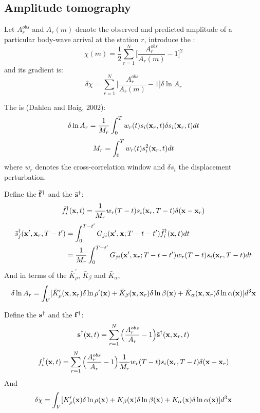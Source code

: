 \subsection{Amplitude tomography}
Let $A_r^{obs}$ and $A_r(m)$ denote the observed and predicted amplitude of a particular body-wave arrival at the station $r$, introduce the :
\[ \chi(m)=\frac{1}{2}\sum_{r=1}^N\Big[\frac{A_r^{obs}}{A_r(m)}-1\Big]^2 \]
and its gradient is:
\[ \delta\chi=\sum_{r=1}^N\Big[\frac{A_r^{obs}}{A_r(m)}-1\Big]\delta\ln A_r \]\par
The  is (Dahlen and Baig, 2002):
\[ \delta\ln A_r=\frac{1}{M_r}\int_0^Tw_r(t)s_i(\mathbf{x}_r,t)\delta s_i(\mathbf{x}_r,t)dt \]
\[ M_r=\int_0^Tw_r(t)s_i^2(\mathbf{x}_r,t)dt \]
where $w_r$ denotes the cross-correlation window and $\delta s_i$ the displacement perturbation.\par
Define the  $\bar{\mathbf{f}}^\dagger$ and the  $\bar{\mathbf{s}}^\dagger$:
\[ \bar f_i^\dagger(\mathbf{x},t)=\frac{1}{M_r}w_r(T-t)s_i(\mathbf{x}_r,T-t)\delta(\mathbf{x}-\mathbf{x}_r) \]
\begin{align*}
  \bar s_j^\dagger(\mathbf{x}',\mathbf{x}_r,T-t') & =\int_0^{T-t'}G_{ji}(\mathbf{x}',\mathbf{x};T-t-t')\bar f_i^\dagger(\mathbf{x},t) dt \\
    & =\frac{1}{M_r}\int_0^{T-t'}G_{ji}(\mathbf{x}',\mathbf{x}_r;T-t-t')w_r(T-t)s_i(\mathbf{x}_r,T-t)dt
\end{align*}
And in terms of the  $\bar K_\rho^\prime$, $\bar K_\beta$ and $\bar K_\alpha$,
\[ \delta\ln A_r=\int_V[\bar K_\rho^\prime(\mathbf{x},\mathbf{x}_r)\delta\ln\rho^\prime(\mathbf{x})+\bar K_\beta(\mathbf{x},\mathbf{x}_r)\delta\ln\beta(\mathbf{x})+\bar K_\alpha(\mathbf{x},\mathbf{x}_r)\delta\ln\alpha(\mathbf{x})]d^3\mathbf{x} \]\par
Define the  $\mathbf{s}^\dagger$ and the  $\mathbf{f}^\dagger$:
\[ \mathbf{s}^\dagger(\mathbf{x},t)=\sum_{r=1}^N\Big(\frac{A_r^{obs}}{A_r}-1\Big)\bar{\mathbf{s}}^\dagger(\mathbf{x},\mathbf{x}_r,t) \]
\[ f_i^\dagger(\mathbf{x},t)=\sum_{r=1}^N\Big(\frac{A_r^{obs}}{A_r}-1\Big)\frac{1}{M_r}w_r(T-t)s_i(\mathbf{x}_r,T-t)\delta(\mathbf{x}-\mathbf{x}_r) \]
And
\[ \delta\chi=\int_V[K_\rho^\prime(\mathbf{x})\delta\ln\rho(\mathbf{x})+K_\beta(\mathbf{x})\delta\ln\beta(\mathbf{x})+K_\alpha(\mathbf{x})\delta\ln\alpha(\mathbf{x})]d^3\mathbf{x} \]\par
